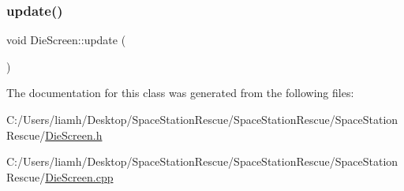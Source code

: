 \mbox{\label{class_die_screen_ac7908cfa219b934848c36685fe5337a0}} 
\subsubsection{\texorpdfstring{update()}{update()}}
{\footnotesize\ttfamily void Die\+Screen\+::update (\begin{DoxyParamCaption}{ }\end{DoxyParamCaption})}



The documentation for this class was generated from the following files\+:\begin{DoxyCompactItemize}
\item 
C\+:/\+Users/liamh/\+Desktop/\+Space\+Station\+Rescue/\+Space\+Station\+Rescue/\+Space\+Station\+Rescue/\mbox{\hyperlink{_die_screen_8h}{Die\+Screen.\+h}}\item 
C\+:/\+Users/liamh/\+Desktop/\+Space\+Station\+Rescue/\+Space\+Station\+Rescue/\+Space\+Station\+Rescue/\mbox{\hyperlink{_die_screen_8cpp}{Die\+Screen.\+cpp}}\end{DoxyCompactItemize}
